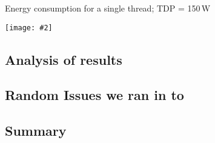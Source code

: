 \documentclass[12pt]{article}
\newcommand{\includegraphicsw}[2][1.]{\texttt{[image: \#2]}}
\begin{document}
\begin{table}[H]
	\centering\caption{Energy consumption for a single thread; TDP = 150\,W}
	\includegraphicsw[.9]{rapl.pdf}
\end{table}

\subsection{Analysis of results}

\subsection{Random Issues we ran in to}

\subsection{Summary}




\end{document}
